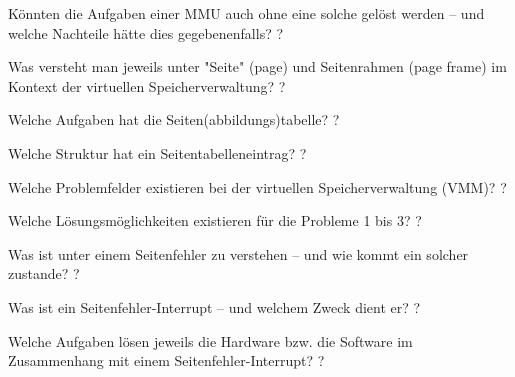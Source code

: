\documentclass[avery5371]{flashcards}
\begin{document}
\begin{flashcard}[Speichermanagement]{Könnten die Aufgaben einer MMU auch ohne eine solche gelöst werden – und welche Nachteile hätte dies gegebenenfalls?}
    ?
\end{flashcard}

\begin{flashcard}[Speichermanagement]{Was versteht man jeweils unter "Seite" (page) und Seitenrahmen (page frame) im Kontext der virtuellen Speicherverwaltung? }
    ?
\end{flashcard}

\begin{flashcard}[Speichermanagement]{Welche Aufgaben hat die Seiten(abbildungs)tabelle? }
    ?
\end{flashcard}

\begin{flashcard}[Speichermanagement]{Welche Struktur hat ein Seitentabelleneintrag?}
    ?
\end{flashcard}

\begin{flashcard}[Speichermanagement]{Welche Problemfelder existieren bei der virtuellen Speicherverwaltung (VMM)?}
    ?
\end{flashcard}

\begin{flashcard}[Speichermanagement]{Welche Lösungsmöglichkeiten existieren für die Probleme 1 bis 3?}
    ?
\end{flashcard}

\begin{flashcard}[Speichermanagement]{Was ist unter einem Seitenfehler zu verstehen – und wie kommt ein solcher zustande? }
    ?
\end{flashcard}

\begin{flashcard}[Speichermanagement]{Was ist ein Seitenfehler-Interrupt – und welchem Zweck dient er? }
    ?
\end{flashcard}

\begin{flashcard}[Speichermanagement]{Welche Aufgaben lösen jeweils die Hardware bzw. die Software im Zusammenhang mit einem Seitenfehler-Interrupt?}
    ?
\end{flashcard}
\end{document}
